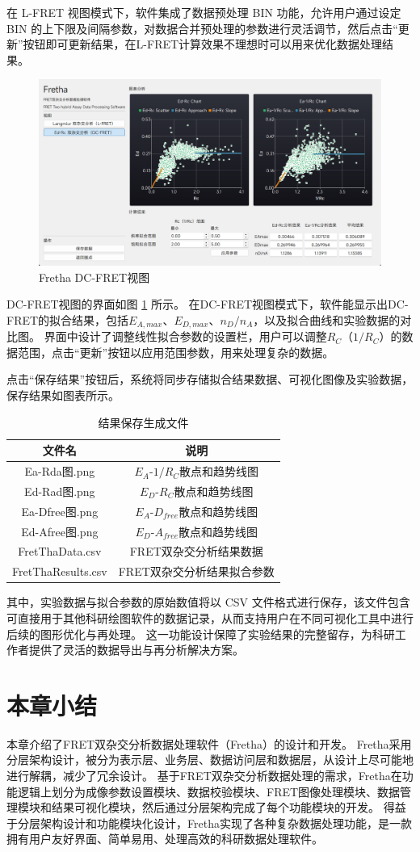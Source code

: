 在 L-FRET 视图模式下，软件集成了数据预处理 BIN 功能，允许用户通过设定 BIN 的上下限及间隔参数，对数据合并预处理的参数进行灵活调节，然后点击“更新”按钮即可更新结果，在L-FRET计算效果不理想时可以用来优化数据处理结果。

\begin{figure}[htbp]
  \centering
  \includegraphics[width=0.9\linewidth]{../figures/2/2_DC-FRET结果界面.png}
  \caption{Fretha DC-FRET视图}
  \label{fig:fretha_dc_fret}
\end{figure}

DC-FRET视图的界面如图 \ref{fig:fretha_dc_fret} 所示。
在DC-FRET视图模式下，软件能显示出DC-FRET的拟合结果，包括$E_{A,max}$、$E_{D,max}$、$n_D/n_A$，以及拟合曲线和实验数据的对比图。
界面中设计了调整线性拟合参数的设置栏，用户可以调整$R_C$（$1/R_C$）的数据范围，点击“更新”按钮以应用范围参数，用来处理复杂的数据。

点击“保存结果”按钮后，系统将同步存储拟合结果数据、可视化图像及实验数据，保存结果如图表所示。
\begin{table}[htbp]
  \centering
  \caption{结果保存生成文件}
  \label{tab:fretha_result_list}
    \begin{tabular}{cc}
      \toprule
      {文件名} & {说明} \\
      \hline
      Ea-Rda图.png & $E_A$-$1/R_C$散点和趋势线图 \\
      Ed-Rad图.png & $E_D$-$R_C$散点和趋势线图 \\
      Ea-Dfree图.png & $E_A$-$D_{free}$散点和趋势线图 \\
      Ed-Afree图.png & $E_D$-$A_{free}$散点和趋势线图 \\
      FretThaData.csv & FRET双杂交分析结果数据 \\
      FretThaResults.csv & FRET双杂交分析结果拟合参数 \\
      \bottomrule
    \end{tabular}
\end{table}
其中，实验数据与拟合参数的原始数值将以 CSV 文件格式进行保存，该文件包含可直接用于其他科研绘图软件的数据记录，从而支持用户在不同可视化工具中进行后续的图形优化与再处理。
这一功能设计保障了实验结果的完整留存，为科研工作者提供了灵活的数据导出与再分析解决方案。
\fi

\section{本章小结}

\ifshowtext
本章介绍了FRET双杂交分析数据处理软件（Fretha）的设计和开发。
Fretha采用分层架构设计，被分为表示层、业务层、数据访问层和数据层，从设计上尽可能地进行解耦，减少了冗余设计。
基于FRET双杂交分析数据处理的需求，Fretha在功能逻辑上划分为成像参数设置模块、数据校验模块、FRET图像处理模块、数据管理模块和结果可视化模块，然后通过分层架构完成了每个功能模块的开发。
得益于分层架构设计和功能模块化设计，Fretha实现了各种复杂数据处理功能，是一款拥有用户友好界面、简单易用、处理高效的科研数据处理软件。
\fi